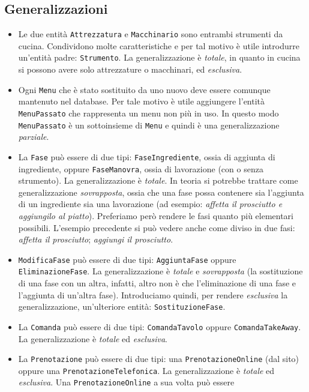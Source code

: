 \subsection{Generalizzazioni}
\begin{itemize}
\item Le due entità {\tt Attrezzatura} e {\tt Macchinario} sono entrambi
    strumenti da cucina. Condividono molte caratteristiche e per tal motivo è
    utile introdurre un'entità padre: {\tt Strumento}. La generalizzazione è
    {\it totale}, in quanto in cucina si possono avere solo attrezzature o
    macchinari, ed {\it esclusiva}.
\item Ogni {\tt Menu} che è stato sostituito da uno nuovo deve essere comunque
    mantenuto nel database. Per tale motivo è utile aggiungere l'entità
    {\tt MenuPassato} che rappresenta un menu non più in uso. In questo modo
    {\tt MenuPassato} è un sottoinsieme di {\tt Menu} e quindi è una generalizzazione
    {\it parziale}.
\item La {\tt Fase} può essere di due tipi: {\tt FaseIngrediente}, ossia di aggiunta
    di ingrediente, oppure {\tt FaseManovra}, ossia di lavorazione (con o senza strumento).
    La generalizzazione è {\it totale}. In teoria si potrebbe trattare come generalizzazione
    {\it sovrapposta}, ossia che una fase possa contenere sia l'aggiunta di un ingrediente
    sia una lavorazione (ad esempio: {\it affetta il prosciutto e aggiungilo al piatto}).
    Preferiamo però rendere le fasi quanto più elementari possibili. L'esempio precedente
    si può vedere anche come diviso in due fasi: {\it affetta il prosciutto}; {\it aggiungi il
    prosciutto}.
\item {\tt ModificaFase} può essere di due tipi: {\tt AggiuntaFase} oppure {\tt EliminazioneFase}.
    La generalizzazione è {\it totale} e {\it sovrapposta} (la sostituzione di una fase con
    un altra, infatti, altro non è che l'eliminazione di una fase e l'aggiunta di un'altra
    fase). Introduciamo quindi, per rendere {\it esclusiva} la generalizzazione, un'ulteriore
    entità: {\tt SostituzioneFase}.
\item La {\tt Comanda} può essere di due tipi: {\tt ComandaTavolo} oppure
    {\tt ComandaTakeAway}. La generalizzazione è {\it totale} ed
    {\it esclusiva}.
\item La {\tt Prenotazione} può essere di due tipi: una {\tt PrenotazioneOnline} (dal sito)
    oppure una {\tt PrenotazioneTelefonica}. La generalizzazione è {\it totale}
    ed {\it esclusiva}. Una {\tt PrenotazioneOnline} a sua volta può essere

\end{itemize}
